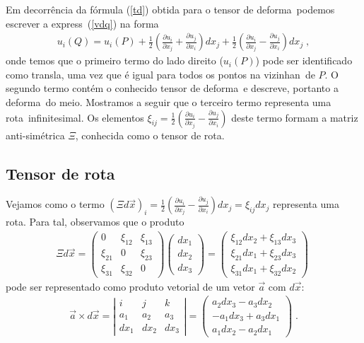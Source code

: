Em decorr\^encia da f\'ormula (\ref{td}) obtida para o
tensor de deforma\cao\ podemos escrever a express\ao\
(\ref{vdq}) na forma
\begin{eqnarray} \label{vdq2}
u_i(Q) = u_i(P) + \frac{1}{2}\left( \frac{\partial u_i}
{\partial x_j} + \frac{\partial u_j}{\partial x_i}\right)
dx_j + \frac{1}{2}\left( \frac{\partial u_i}{\partial x_j}
- \frac{\partial u_j}{\partial x_i}\right)dx_j \; ,
\end{eqnarray}
onde temos que o primeiro termo do lado direito ($u_i(P)$)
pode ser identificado como transla\cao, uma vez que \'e
igual para todos os pontos na vizinhan\ca\ de $P$. O segundo
termo cont\'em o conhecido tensor de deforma\cao\ e descreve, portanto a
deforma\cao\ do meio. Mostramos a seguir que
o terceiro termo  representa uma rota\cao\ infinitesimal.
Os elementos $\xi_{ij} = \frac{1}{2} \left(\frac{\partial u_i}{\partial x_j} -
\frac{\partial u_j}{\partial x_i}\right)$ deste termo formam a matriz
anti-sim\'etrica $\Xi$, conhecida como o tensor de rota\cao.

\subsection{Tensor de rota\cao}

Vejamos como o termo $\left( \Xi d\vec{x} \right)_i=
\frac{1}{2} \left( \frac{\partial u_i}{\partial x_j} -
\frac{\partial u_j}{\partial x_i}\right) dx_j = \xi_{ij}
dx_j$ representa uma rota\cao.
Para tal, observamos que o produto
\begin{eqnarray}
\Xi d\vec{x} = \left(
\begin{array}{ccc}
0 & \xi_{12} & \xi_{13} \\
\xi_{21} & 0 & \xi_{23} \\
\xi_{31} & \xi_{32} & 0
\end{array} \right)
\left(
\begin{array}{c}
dx_1 \\
dx_2 \\
dx_3
\end{array} \right)
= \left(
\begin{array}{c}
\xi_{12} dx_2 + \xi_{13} dx_3 \\
\xi_{21} dx_1 + \xi_{23} dx_3 \\
\xi_{31} dx_1 + \xi_{32} dx_2
\end{array}
\right) \;
\end{eqnarray}
pode ser representado como produto vetorial de um vetor
$\vec{a}$  com $d\vec{x}$:
\begin{eqnarray}
\vec{a} \times d\vec{x} = \left|
\begin{array}{ccc}
i & j & k \\
a_1 & a_2 & a_3 \\
dx_1 & dx_2 & dx_3
\end{array} \right|
= \left(
\begin{array}{c}
a_2 dx_3 - a_3 dx_2 \\
-a_1 dx_3 + a_3 dx_1 \\
a_1 dx_2 - a_2 dx_1
\end{array}
\right) \; .
\end{eqnarray}

